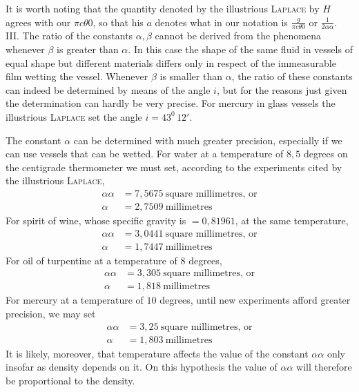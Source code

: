 \expandafter\def\csname HistoricalNoteText7\endcsname{It is worth noting that the quantity denoted by the illustrious \textsc{Laplace} by $H$ agrees with our $\pi c\theta0$, so that his $a$ denotes what in our notation is $\frac{g}{\pi c\theta0}$ or $\frac1{2\alpha\alpha}$.}%
III. The ratio of the constants $\alpha,\beta$ cannot be derived from the phenomena whenever $\beta$ is greater than $\alpha$. In this case the shape of the same fluid in vessels of equal shape but different materials differs only in respect of the immeasurable film wetting the vessel. Whenever $\beta$ is smaller than $\alpha$, the ratio of these constants can indeed be determined by means of the angle $i$, but for the reasons just given the determination can hardly be very precise. For mercury in glass vessels the illustrious \textsc{Laplace} set the angle $i=43^0\,12'$.

The constant $\alpha$ can be determined with much greater precision, especially if we can use vessels that can be wetted. For water at a temperature of $8{,}5$ degrees on the centigrade thermometer we must set, according to the experiments cited by the illustrious \textsc{Laplace},
\[
\begin{aligned}
\alpha\alpha&=7{,}5675\ \text{square millimetres, or}\\
\alpha&=2{,}7509\ \text{millimetres}
\end{aligned}
\]
For spirit of wine, whose specific gravity is $=0{,}81961$, at the same temperature,
\[
\begin{aligned}
\alpha\alpha&=3{,}0441\ \text{square millimetres, or}\\
\alpha&=1{,}7447\ \text{millimetres}
\end{aligned}
\]
For oil of turpentine at a temperature of $8$ degrees,
\[
\begin{aligned}
\alpha\alpha&=3{,}305\ \text{square millimetres, or}\\
\alpha&=1{,}818\ \text{millimetres}
\end{aligned}
\]
For mercury at a temperature of $10$ degrees, until new experiments afford greater precision, we may set
\[
\begin{aligned}
\alpha\alpha&=3{,}25\ \text{square millimetres, or}\\
\alpha&=1{,}803\ \text{millimetres}
\end{aligned}
\]
It is likely, moreover, that temperature affects the value of the constant $\alpha\alpha$ only insofar as density depends on it. On this hypothesis the value of $\alpha\alpha$ will therefore be proportional to the density.

